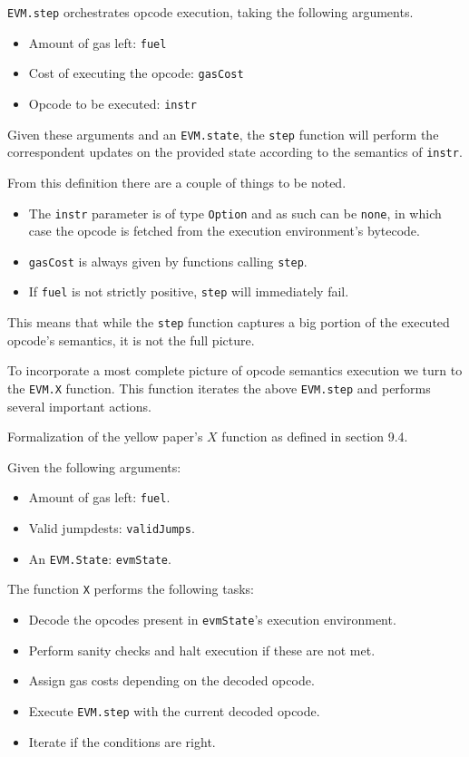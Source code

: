 \begin{definition}
\label{def:EVM.step}\leanok
\texttt{EVM.step} orchestrates opcode execution, taking the following arguments.
\begin{itemize}
\item Amount of gas left: \texttt{fuel}
\item Cost of executing the opcode: \texttt{gasCost}
\item Opcode to be executed: \texttt{instr}
\end{itemize}

Given these arguments and an \texttt{EVM.state}, the \texttt{step} function will
perform the correspondent updates on the provided state according to the
semantics of \texttt{instr}.
\end{definition}

From this definition there are a couple of things to be noted.
\begin{itemize}
\item The \texttt{instr} parameter is of type \texttt{Option} and as such
can be \texttt{none}, in which case the opcode is fetched from the execution
environment's bytecode.
\item \texttt{gasCost} is always given by functions calling \texttt{step}.
\item If \texttt{fuel} is not strictly positive, \texttt{step} will immediately fail.
\end{itemize}
This means that while the \texttt{step} function captures a big portion of the
executed opcode's semantics, it is not the full picture.

To incorporate a most complete picture of opcode semantics execution we turn to
the \texttt{EVM.X} function. This function iterates the above \texttt{EVM.step}
and performs several important actions.

\begin{definition}[EVM.X]
\label{def:EVM.X}\leanok{}
Formalization of the yellow paper's $X$ function as defined in section 9.4.

Given the following arguments:
\begin{itemize}
\item Amount of gas left: \texttt{fuel}.
\item Valid jumpdests: \texttt{validJumps}.
\item An \texttt{EVM.State}: \texttt{evmState}.
\end{itemize}

The function \texttt{X} performs the following tasks:
\begin{itemize}
\item Decode the opcodes present in \texttt{evmState}'s execution
environment.
\item Perform sanity checks and halt execution if these are not met.
\item Assign gas costs depending on the decoded opcode.
\item Execute \texttt{EVM.step} with the current decoded opcode.
\item Iterate if the conditions are right.
\end{itemize}
\end{definition}

